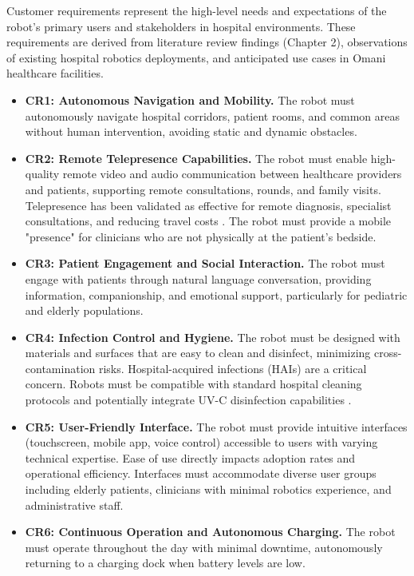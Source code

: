 Customer requirements represent the high-level needs and expectations of the robot's primary users and stakeholders in hospital environments. These requirements are derived from literature review findings (Chapter 2), observations of existing hospital robotics deployments, and anticipated use cases in Omani healthcare facilities.

\begin{itemize}
    \item \textbf{CR1: Autonomous Navigation and Mobility.} The robot must autonomously navigate hospital corridors, patient rooms, and common areas without human intervention, avoiding static and dynamic obstacles. 
    
    \item \textbf{CR2: Remote Telepresence Capabilities.} The robot must enable high-quality remote video and audio communication between healthcare providers and patients, supporting remote consultations, rounds, and family visits. Telepresence has been validated as effective for remote diagnosis, specialist consultations, and reducing travel costs \cite{garingo2016}. The robot must provide a mobile "presence" for clinicians who are not physically at the patient's bedside.
    
    \item \textbf{CR3: Patient Engagement and Social Interaction.} The robot must engage with patients through natural language conversation, providing information, companionship, and emotional support, particularly for pediatric and elderly populations.
    
    \item \textbf{CR4: Infection Control and Hygiene.} The robot must be designed with materials and surfaces that are easy to clean and disinfect, minimizing cross-contamination risks. Hospital-acquired infections (HAIs) are a critical concern. Robots must be compatible with standard hospital cleaning protocols and potentially integrate UV-C disinfection capabilities \cite{intel2024, sciencedirect2021}.
    
    \item \textbf{CR5: User-Friendly Interface.} The robot must provide intuitive interfaces (touchscreen, mobile app, voice control) accessible to users with varying technical expertise. Ease of use directly impacts adoption rates and operational efficiency. Interfaces must accommodate diverse user groups including elderly patients, clinicians with minimal robotics experience, and administrative staff.
    
    \item \textbf{CR6: Continuous Operation and Autonomous Charging.} The robot must operate throughout the day with minimal downtime, autonomously returning to a charging dock when battery levels are low.
\end{itemize}


